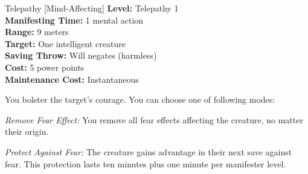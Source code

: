 {Telepathy [Mind-Affecting]}
{
    \textbf{Level:}
    Telepathy 1\\
    \textbf{Manifesting Time:}
    1 mental action\\
    \textbf{Range:}
    9 meters\\
    \textbf{Target:}
    One intelligent creature\\
    \textbf{Saving Throw:}
    Will negates (harmless)\\
    \textbf{Cost:}
    5 power points\\
    \textbf{Maintenance Cost:}
    Instantaneous\\
}
{
    You bolster the target's courage. You can choose one of following modes:

    \textit{Remove Fear Effect:} You remove all fear effects affecting the creature, no matter their origin.

    \textit{Protect Against Fear:} The creature gains advantage in their next save against fear. This protection lasts ten minutes plus one minute per manifester level.
}
